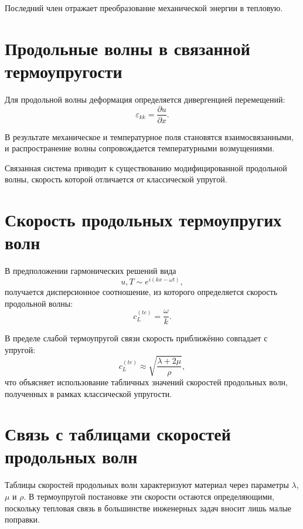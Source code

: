 \documentclass[12pt]{article}
\begin{document}
Последний член отражает преобразование механической энергии
в тепловую.

\section{Продольные волны в связанной термоупругости}

Для продольной волны деформация определяется дивергенцией перемещений:
\begin{equation}
\varepsilon_{kk} = \frac{\partial u}{\partial x}.
\end{equation}

В результате механическое и температурное поля
становятся взаимосвязанными,
и распространение волны сопровождается
температурными возмущениями.

Связанная система приводит к существованию
модифицированной продольной волны,
скорость которой отличается от классической упругой.

\section{Скорость продольных термоупругих волн}

В предположении гармонических решений вида
\begin{equation}
u, T \sim e^{i(kx - \omega t)},
\end{equation}
получается дисперсионное соотношение,
из которого определяется скорость продольной волны:
\begin{equation}
c_L^{(te)} = \frac{\omega}{k}.
\end{equation}

В пределе слабой термоупругой связи
скорость приближённо совпадает с упругой:
\begin{equation}
c_L^{(te)} \approx \sqrt{\frac{\lambda + 2\mu}{\rho}},
\end{equation}
что объясняет использование табличных значений
скоростей продольных волн,
полученных в рамках классической упругости.

\section{Связь с таблицами скоростей продольных волн}

Таблицы скоростей продольных волн
характеризуют материал через параметры
$\lambda$, $\mu$ и $\rho$.
В термоупругой постановке эти скорости
остаются определяющими,
поскольку тепловая связь
в большинстве инженерных задач
вносит лишь малые поправки.
\end{document}
